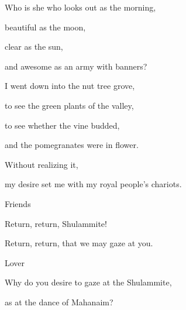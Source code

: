{\par }{\BB \par }{\Q {}Who is she who looks out as the morning,
\par }{\QB beautiful as the moon,
\par }{\QB clear as the sun,
\par }{\QB and awesome as an army with banners?
\par }{\BB \par }{\Q {}I went down into the nut tree grove,
\par }{\QB to see the green plants of the valley,
\par }{\QB to see whether the vine budded,
\par }{\QB and the pomegranates were in flower.
\par }{\Q {}Without realizing it,
\par }{\QB my desire set me with my royal people’s chariots.
\par }{\SP Friends
\par }{\Q {}Return, return, Shulammite!
\par }{\QB Return, return, that we may gaze at you.
\par }{\SP Lover
\par }{\Q Why do you desire to gaze at the Shulammite,
\par }{\QB as at the dance of Mahanaim?

}
